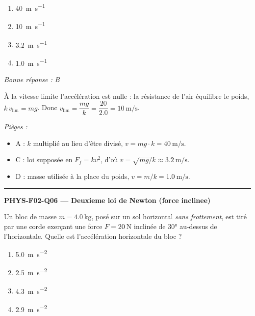 \documentclass[11pt,a4paper]{article}
\newcommand{\vv}[1]{\vec{#1}}\newcommand{\ds}{\displaystyle}
\begin{document}
\begin{enumerate}[label=\Alph*)]
\item \qty{40}{\metre\per\second}
\item \qty{10}{\metre\per\second}
\item \qty{3.2}{\metre\per\second}
\item \qty{1.0}{\metre\per\second}
\end{enumerate}
\textit{Bonne réponse : B}\par
À la vitesse limite l'accélération est nulle : la résistance de l'air équilibre le poids, $k\,v_{\lim}=mg$. Donc $v_{\lim}=\dfrac{mg}{k}=\dfrac{20}{\num{2.0}}=\qty{10}{\metre\per\second}$.\par
\textit{Pièges :}
\begin{itemize}
\item A : $k$ multiplié au lieu d'être divisé, $v=mg\cdot k=\qty{40}{\metre\per\second}$.
\item C : loi supposée en $F_f=k v^2$, d'où $v=\sqrt{mg/k}\approx\qty{3.2}{\metre\per\second}$.
\item D : masse utilisée à la place du poids, $v=m/k=\qty{1.0}{\metre\per\second}$.
\end{itemize}
\vspace{8pt}\hrule\vspace{8pt}
\noindent\textbf{PHYS-F02-Q06 --- Deuxieme loi de Newton (force inclinee)}\par
Un bloc de masse $m=\qty{4.0}{\kilogram}$, posé sur un sol horizontal \emph{sans frottement}, est tiré par une corde exerçant une force $F=\qty{20}{\newton}$ inclinée de \ang{30} au-dessus de l'horizontale. Quelle est l'accélération horizontale du bloc ?
\begin{center}
\end{center}
\begin{enumerate}[label=\Alph*)]
\item \qty{5.0}{\metre\per\second\squared}
\item \qty{2.5}{\metre\per\second\squared}
\item \qty{4.3}{\metre\per\second\squared}
\item \qty{2.9}{\metre\per\second\squared}
\end{enumerate}
\end{document}
